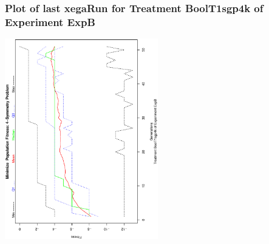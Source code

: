  \begin{frame}
 \frametitle{ Plot of last xegaRun for Treatment BoolT1sgp4k of Experiment ExpB }
 \begin{center}
\includegraphics[width=0.5\textwidth, angle=-90]
{ExpBPlotPopStatsFigure007.eps}
 \end{center}
 \label{report/ExpBPlotPopStatsFigure007.eps}  
 \end{frame}

